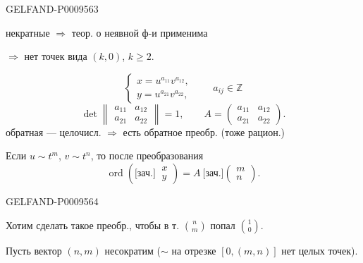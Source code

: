 \begin{GelfandAdjacentEvidence}{GELFAND-P000956}{3}

некратные $\Rightarrow$ теор. о неявной ф-и применима

$\Rightarrow$ нет точек вида $(k,0)$, $k\geqslant2$.

\begin{equation*}
 \begin{cases}
 x=u^{a_{11}}v^{a_{12}},\\
 y=u^{a_{21}}v^{a_{22}},
 \end{cases}
 \qquad a_{ij}\in\mathbb Z
 \tag{7}
\end{equation*}
\begin{equation*}
 \det\begin{Vmatrix}a_{11}&a_{12}\\a_{21}&a_{22}\end{Vmatrix}=1,
 \qquad A=\begin{pmatrix}a_{11}&a_{12}\\a_{21}&a_{22}\end{pmatrix}.
 \tag{8}
\end{equation*}
обратная --- целочисл. $\Rightarrow$ есть обратное преобр. (тоже рацион.)

Если $u\sim t^m$, $v\sim t^n$, то после преобразования
\begin{equation*}
 \operatorname{ord}\left(\text{[зач.]}\ \begin{matrix}x\\y\end{matrix}\right)
 =A\ \text{[зач.]}\begin{pmatrix}m\\n\end{pmatrix}.
 \tag{9}
\end{equation*}
\end{GelfandAdjacentEvidence}
\begin{GelfandAdjacentEvidence}{GELFAND-P000956}{4}


Хотим сделать такое преобр., чтобы в т. $\binom{n}{m}$ попал $\binom{1}{0}$.

Пусть вектор $(n,m)$ несократим ($\sim$ на отрезке $[0,(m,n)]$ нет целых точек).
\end{GelfandAdjacentEvidence}
